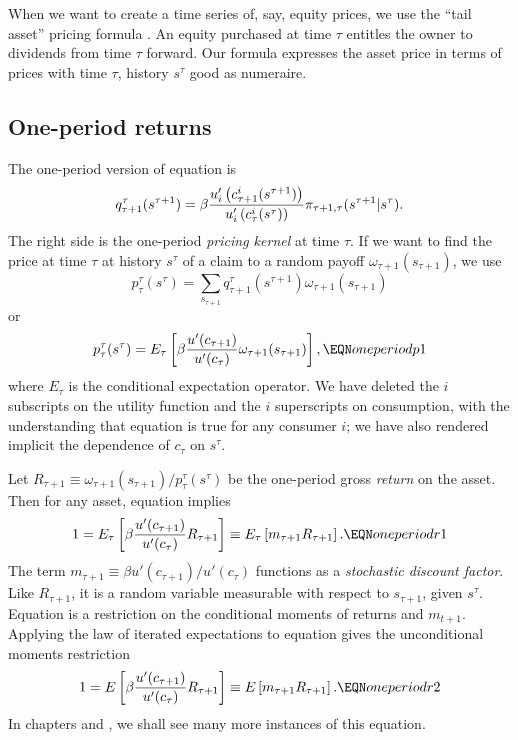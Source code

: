 When we want to create a time series of, say, equity prices,
we use the ``tail asset'' pricing formula .  An equity purchased
at time $\tau$ entitles the owner to  dividends from time
$\tau$ forward.   Our formula  expresses
the asset price in terms of prices with time $\tau$, history
$s^\tau$ good as numeraire.





\subsection{One-period returns}
The one-period version of equation  is
$$q^\tau_{\tau+1}(s^{\tau +1}) = \beta 
  {u'_i\left(c_{\tau+1}^i(s^{\tau+1})\right)
    \over u'_i\left(c_\tau^i(s^\tau)\right) } 
\pi_{\tau+1,\tau}(s^{\tau+1} \vert s^\tau). $$
The right side is the one-period {\it pricing kernel} at time $\tau$.
If we want to  find the  price  at time $\tau$ at history $s^\tau$
of a claim to a random payoff $\omega_{\tau+1}(s_{\tau+1})$, 
we use
$$ p^\tau_{\tau}(s^\tau) = \sum_{s_{\tau+1}} q^\tau_{\tau+1}(s^{\tau+1})
      \omega_{\tau+1}(s_{\tau+1}) $$
or
$$ p^\tau_{\tau}(s^\tau) = E_\tau \left[\beta {u'(c_{\tau+1}) \over u'(c_{\tau})}
       \omega_{\tau+1}(s_{\tau +1}) \right], \EQN oneperiodp1 $$
where $E_\tau$ is the conditional expectation operator.
We have deleted the $i$ subscripts on the utility function
and the $i$ superscripts on consumption, with the
understanding that equation  is true for any consumer $i$;
we have also rendered implicit the  dependence of $c_{\tau}$ on $s^\tau$.


Let $R_{\tau+1} \equiv \omega_{\tau+1}(s_{\tau+1}) 
/p^\tau_{\tau}(s^\tau) $
 be the one-period gross {\it return} on the asset.
Then for any asset, equation  implies
$$ 1 = E_\tau \left[\beta{u'(c_{\tau+1}) \over u'(c_\tau)} R_{\tau+1} \right]
     \equiv E_\tau \left[ m_{\tau+1} R_{\tau+1} \right]  .
    \EQN oneperiodr1 $$
The term $m_{\tau+1} \equiv \beta u'(c_{\tau+1}) / u'(c_\tau)$
functions as a {\it stochastic discount factor}.    Like
$R_{\tau+1}$, it is a random %
variable  measurable with respect to $s_{\tau+1}$, given
$s^{\tau}$.
    Equation  is a restriction on
the conditional moments of returns and $m_{t+1}$.  Applying
the law of iterated expectations to equation  gives
the unconditional moments restriction
$$ 1 = E \left[\beta{u'(c_{\tau+1}) \over u'(c_\tau)} R_{\tau+1} \right]
     \equiv E \left[ m_{\tau+1} R_{\tau+1} \right]  .
    \EQN oneperiodr2 $$
In chapters  and , we shall see many more instances of this
equation.


